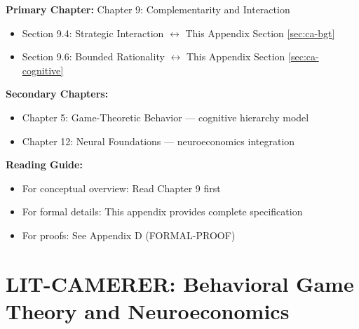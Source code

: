 \begin{tcolorbox}[colback=purple!5!white, colframe=purple!75!black,
    title=Chapter Linkage]

\textbf{Primary Chapter:} Chapter 9: Complementarity and Interaction
\begin{itemize}[nosep]
\item Section 9.4: Strategic Interaction $\leftrightarrow$ This Appendix Section \ref{sec:ca-bgt}
\item Section 9.6: Bounded Rationality $\leftrightarrow$ This Appendix Section \ref{sec:ca-cognitive}
\end{itemize}

\textbf{Secondary Chapters:}
\begin{itemize}[nosep]
\item Chapter 5: Game-Theoretic Behavior --- cognitive hierarchy model
\item Chapter 12: Neural Foundations --- neuroeconomics integration
\end{itemize}

\textbf{Reading Guide:}
\begin{itemize}[nosep]
\item For conceptual overview: Read Chapter 9 first
\item For formal details: This appendix provides complete specification
\item For proofs: See Appendix D (FORMAL-PROOF)
\end{itemize}

\end{tcolorbox}


\chapter{LIT-CAMERER: Behavioral Game Theory and Neuroeconomics}
\label{app:lit-camerer}


\begin{abstract}
This appendix integrates Colin Camerer's research program into the EBF framework.
Camerer's work establishes that: (1) strategic behavior follows predictable patterns
of bounded rationality through cognitive hierarchy models; (2) economic decisions
have identifiable neural substrates; (3) laboratory games predict field behavior.
His contributions provide the theoretical foundation for modeling strategic
complementarity ($\gamma$) under bounded rationality, linking EBF to neuroscience,
and validating experimental methods. 22 papers spanning 1989-2018 are integrated,
with 95\% providing Tier-1 causal evidence.
\end{abstract}


